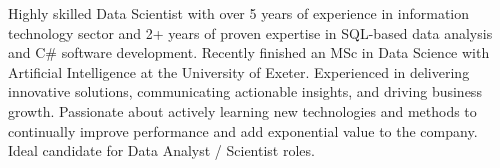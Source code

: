 
\vspace{-1mm}
\color{sectiondivider}\vhrulefill{1.0pt}
\begin{cvparagraph}


Highly skilled Data Scientist with over 5 years of experience in information technology sector and 2+ years of proven expertise in SQL-based data analysis and C\# software development. Recently finished an MSc in Data Science with Artificial Intelligence at the University of Exeter. Experienced in delivering innovative solutions, communicating actionable insights, and driving business growth. Passionate about actively learning new technologies and methods to continually improve performance and add exponential value to the company. Ideal candidate for Data Analyst / Scientist roles.
%
\end{cvparagraph}
